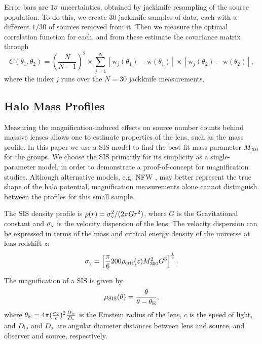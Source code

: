 Error bars are $1 \sigma$ uncertainties, obtained by jackknife resampling of the source population.  To do this, we create 30 jackknife samples of data, each with a different $1/30$ of sources removed from it.  Then we measure the optimal correlation function for each, and from these estimate the covariance matrix through
\begin{equation}
C(\theta_1, \theta_2)= \left( \frac{N}{N-1} \right)^2 \times \sum_{j=1}^N [\mathrm{w}_j(\theta_1)-\bar{\mathrm{w}}(\theta_1)] \times [\mathrm{w}_j(\theta_2)-\bar{\mathrm{w}}(\theta_2)],
\end{equation}
where the index $j$ runs over the $N=30$ jackknife measurements.

\subsection{Halo Mass Profiles}
Measuring the magnification-induced effects on source number counts behind massive lenses allows one to estimate properties of the lens, such as the mass profile.  In this paper we use a \ac{SIS} model to find the best fit mass parameter $M_{200}$ for the groups. We choose the \ac{SIS} primarily for its simplicity as a single-parameter model, in order to demonstrate a proof-of-concept for magnification studies.  Although alternative models, e.g. \acf{NFW} \citep{nfw97}, may better represent the true shape of the halo potential, magnification measurements alone cannot distinguish between the profiles for this small sample.

The \ac{SIS} density profile is $\rho(r)=\sigma_{\rm v}^2/(2 \pi G r^2)$, where $G$ is the Gravitational constant and $\sigma_{\rm v}$ is the velocity dispersion of the lens.  The velocity dispersion can be expressed in terms of the mass and critical energy density of the universe at lens redshift $z$:
\begin{equation}
\sigma_{\rm v} =\left[ \frac{\pi}{6}200\rho_{\rm crit}(z)M_{200}^2 G^3 \right]^\frac{1}{6} .
\end{equation}

The magnification of a \ac{SIS} is given by 
\begin{equation}
\mu_{\rm SIS}(\theta)=\frac{\theta}{\theta-\theta_{\rm E}},
\end{equation}
where $\theta_{\rm E}=4\pi(\frac{\sigma_{\rm v}}{c})^2\frac{D_{\rm ls}}{D_{\rm s}}$ is the Einstein radius of the lens, $c$ is the speed of light, and $D_{\rm ls}$ and $D_{\rm s}$ are angular diameter distances between lens and source, and observer and source, respectively.

